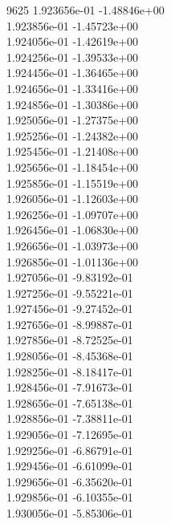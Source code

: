 9625	1.923656e-01	-1.48846e+00	\\ 	1.923856e-01	-1.45723e+00	\\ 	1.924056e-01	-1.42619e+00	\\ 	1.924256e-01	-1.39533e+00	\\ 	1.924456e-01	-1.36465e+00	\\ 	1.924656e-01	-1.33416e+00	\\ 	1.924856e-01	-1.30386e+00	\\ 	1.925056e-01	-1.27375e+00	\\ 	1.925256e-01	-1.24382e+00	\\ 	1.925456e-01	-1.21408e+00	\\ 	1.925656e-01	-1.18454e+00	\\ 	1.925856e-01	-1.15519e+00	\\ 	1.926056e-01	-1.12603e+00	\\ 	1.926256e-01	-1.09707e+00	\\ 	1.926456e-01	-1.06830e+00	\\ 	1.926656e-01	-1.03973e+00	\\ 	1.926856e-01	-1.01136e+00	\\ 	1.927056e-01	-9.83192e-01	\\ 	1.927256e-01	-9.55221e-01	\\ 	1.927456e-01	-9.27452e-01	\\ 	1.927656e-01	-8.99887e-01	\\ 	1.927856e-01	-8.72525e-01	\\ 	1.928056e-01	-8.45368e-01	\\ 	1.928256e-01	-8.18417e-01	\\ 	1.928456e-01	-7.91673e-01	\\ 	1.928656e-01	-7.65138e-01	\\ 	1.928856e-01	-7.38811e-01	\\ 	1.929056e-01	-7.12695e-01	\\ 	1.929256e-01	-6.86791e-01	\\ 	1.929456e-01	-6.61099e-01	\\ 	1.929656e-01	-6.35620e-01	\\ 	1.929856e-01	-6.10355e-01	\\ 	1.930056e-01	-5.85306e-01	\\ \hline

